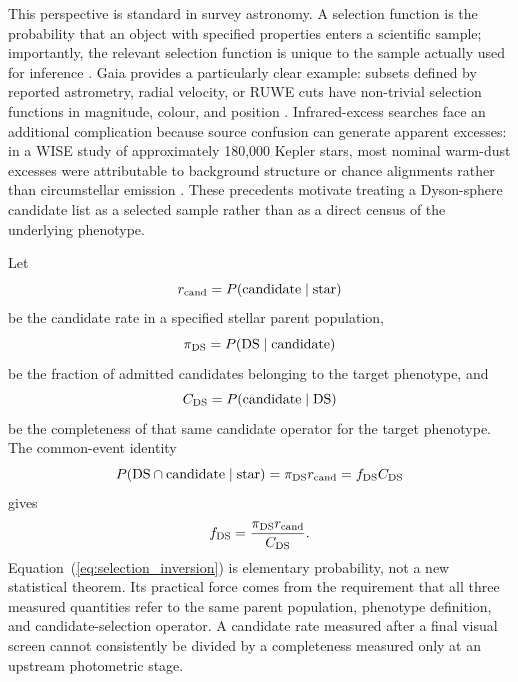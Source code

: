 \documentclass[fleqn,usenatbib]{mnras}
\begin{document}
This perspective is standard in survey astronomy. A selection function is the probability that an object with specified properties enters a scientific sample; importantly, the relevant selection function is unique to the sample actually used for inference \citep{EverallDas2020,BoubertEverall2022}. Gaia provides a particularly clear example: subsets defined by reported astrometry, radial velocity, or RUWE cuts have non-trivial selection functions in magnitude, colour, and position \citep{EverallBoubert2022}. Infrared-excess searches face an additional complication because source confusion can generate apparent excesses: in a WISE study of approximately 180,000 Kepler stars, most nominal warm-dust excesses were attributable to background structure or chance alignments rather than circumstellar emission \citep{KennedyWyatt2012}. These precedents motivate treating a Dyson-sphere candidate list as a selected sample rather than as a direct census of the underlying phenotype.

Let
\begin{equation}
r_{\rm cand}=P({\rm candidate}\mid{\rm star})
\end{equation}
be the candidate rate in a specified stellar parent population,
\begin{equation}
\pi_{\rm DS}=P({\rm DS}\mid{\rm candidate})
\end{equation}
be the fraction of admitted candidates belonging to the target phenotype, and
\begin{equation}
C_{\rm DS}=P({\rm candidate}\mid{\rm DS})
\end{equation}
be the completeness of that same candidate operator for the target phenotype. The common-event identity
\begin{equation}
P({\rm DS}\cap{\rm candidate}\mid{\rm star})
=\pi_{\rm DS}r_{\rm cand}
=f_{\rm DS}C_{\rm DS}
\end{equation}
gives
\begin{equation}
f_{\rm DS}=\frac{\pi_{\rm DS}r_{\rm cand}}{C_{\rm DS}}.
\label{eq:selection_inversion}
\end{equation}
Equation~(\ref{eq:selection_inversion}) is elementary probability, not a new statistical theorem. Its practical force comes from the requirement that all three measured quantities refer to the same parent population, phenotype definition, and candidate-selection operator. A candidate rate measured after a final visual screen cannot consistently be divided by a completeness measured only at an upstream photometric stage.
\end{document}
